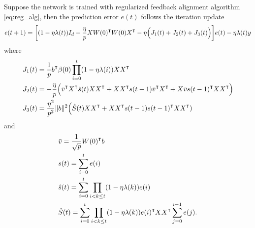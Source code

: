 \begin{lemma}
\label{lma:one_step_update}
Suppose the network is trained with regularized feedback alignment algorithm \eqref{eq:reg_alg}, then the prediction error $e(t)$ follows the iteration update
\begin{equation}
\label{eq:err_update}
\begin{aligned}
    e(t+1) = \bigg[(1-\eta\lambda(t))I_d - \frac{\eta}{p}XW(0)\transpose W(0)X\transpose -\eta\Big(J_1(t)+J_2(t)+J_3(t)\Big)\bigg]e(t) -\eta\lambda(t)y
\end{aligned}
\end{equation}
where
\begin{equation*}
\begin{aligned}
&J_1(t) = \frac{1}{p}b\transpose\beta(0)\prod_{i=0}^{t}(1-\eta\lambda(i))XX\transpose \\
&J_2(t) = -\frac{\eta}{p}\Big(\bar{v}\transpose X\transpose \hat{s}(t) XX\transpose+ XX\transpose s(t-1)\bar{v}\transpose X\transpose + X \bar{v}s(t-1)\transpose XX\transpose\Big) \\
&J_3(t) = \frac{\eta^2}{p^2}\|b\|^2\Big(\hat{S}(t)XX\transpose + XX\transpose s(t-1)s(t-1)\transpose XX\transpose)
\end{aligned} 
\end{equation*}
and
\begin{equation*}
\begin{aligned}
&\bar{v} = \frac{1}{\sqrt p}W(0)\transpose b \\
&s(t) = \sum_{i=0}^{t}e(i) \\
&\hat{s}(t) = \sum_{i=0}^{t}\prod_{i<k\leq t}(1-\eta\lambda(k)) e(i) \\
&\hat{S}(t) = \sum_{i=0}^{t}\prod_{i<k\leq t}(1-\eta\lambda(k))e(i)\transpose XX\transpose \sum_{j=0}^{i-1}e(j).
\end{aligned}
\end{equation*}
\end{lemma}

